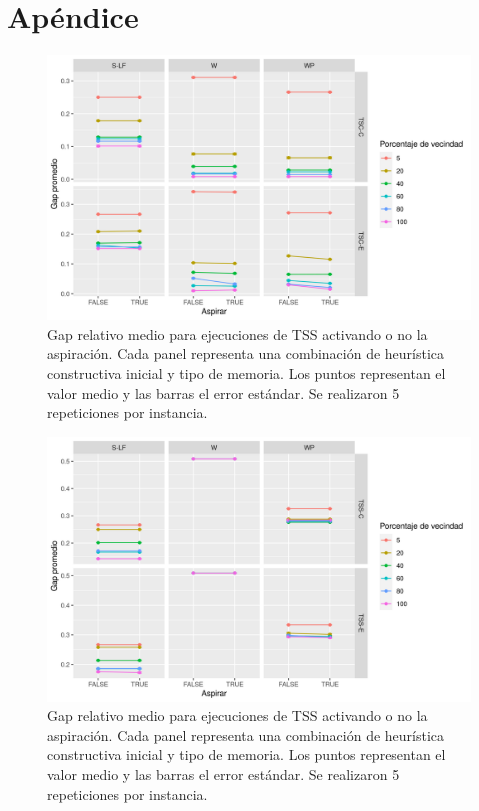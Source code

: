 \section{Apéndice}

\begin{figure}[H]
    \centering
    \includegraphics[scale = 0.7]{plots/suplementarias/aspirar_tsc.png}
    \caption{Gap relativo medio para ejecuciones de TSS activando o no la aspiración. Cada panel representa una combinación de heurística constructiva inicial y tipo de memoria. Los puntos representan el valor medio y las barras el error estándar. Se realizaron 5 repeticiones por instancia.}
    \label{plot:aspirar tsc}
\end{figure}

\begin{figure}[H]
    \centering
    \includegraphics[scale = 0.7]{plots/suplementarias/aspirar_tss.png}
    \caption{Gap relativo medio para ejecuciones de TSS activando o no la aspiración. Cada panel representa una combinación de heurística constructiva inicial y tipo de memoria. Los puntos representan el valor medio y las barras el error estándar. Se realizaron 5 repeticiones por instancia.}
    \label{plot:aspirar tss}
\end{figure}


